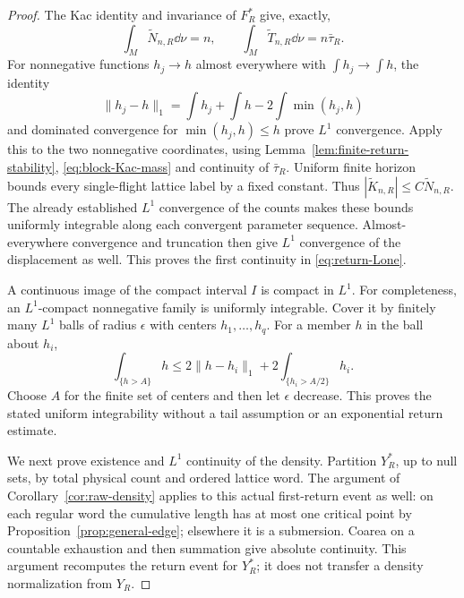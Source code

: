 \begin{proof}
The Kac identity and invariance of $F_R^*$ give, exactly,
\begin{equation}\label{eq:block-Kac-mass}
 \int_M\widetilde N_{n,R}\dd\nu=n,\qquad
 \int_M\widetilde T_{n,R}\dd\nu=n\bar\tau_R.
\end{equation}
For nonnegative functions $h_j\to h$ almost everywhere with
$\int h_j\to\int h$, the identity
\[
 \|h_j-h\|_1=\int h_j+\int h-2\int\min(h_j,h)
\]
and dominated convergence for $\min(h_j,h)\le h$ prove $L^1$
convergence. Apply this to the two nonnegative coordinates, using
Lemma~\ref{lem:finite-return-stability}, \eqref{eq:block-Kac-mass}
and continuity of $\bar\tau_R$. Uniform finite horizon bounds every
single-flight lattice label by a fixed constant. Thus
$|\widetilde K_{n,R}|\le C\widetilde N_{n,R}$. The already established
$L^1$ convergence of the counts makes these bounds uniformly integrable
along each convergent parameter sequence. Almost-everywhere convergence
and truncation then give $L^1$ convergence of the displacement as well.
This proves the first continuity in \eqref{eq:return-Lone}.

A continuous image of the compact interval $I$ is compact in $L^1$.
For completeness, an $L^1$-compact nonnegative family is uniformly
integrable. Cover it by finitely many $L^1$ balls of radius $\epsilon$
with centers $h_1,\ldots,h_q$. For a member $h$ in the ball about $h_i$,
\[
 \int_{\{h>A\}}h
 \le 2\|h-h_i\|_1+
              2\int_{\{h_i>A/2\}}h_i.
\]
Choose $A$ for the finite set of centers and then let $\epsilon$
decrease. This proves the stated uniform integrability without a tail
assumption or an exponential return estimate.

We next prove existence and $L^1$ continuity of the density. Partition
$Y_R^*$, up to null sets, by total physical count and ordered lattice
word. The argument of Corollary~\ref{cor:raw-density} applies to this
actual first-return event as well: on each regular word the cumulative
length has at most one critical point by
Proposition~\ref{prop:general-edge}; elsewhere it is a submersion.
Coarea on a countable exhaustion and then summation give absolute
continuity. This argument recomputes the return event for $Y_R^*$;
it does not transfer a density normalization from $Y_R$.


\end{proof}
